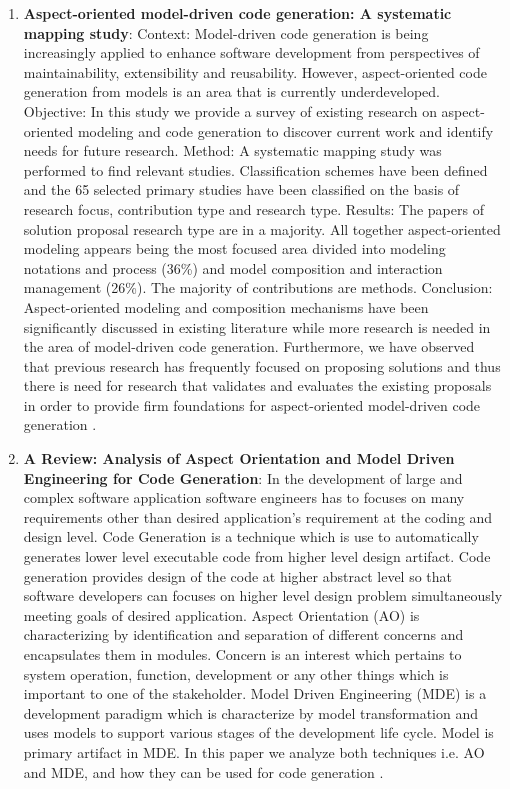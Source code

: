 \begin{englishtext}
\begin{enumerate}
    \item \textbf{Aspect-oriented model-driven code generation: A systematic
    mapping study}: Context: Model-driven code generation is being increasingly
    applied to enhance software development from perspectives of
    maintainability, extensibility and reusability. However, aspect-oriented
    code generation from models is an area that is currently underdeveloped.
    Objective: In this study we provide a survey of existing research on
    aspect-oriented modeling and code generation to discover current work and
    identify needs for future research. Method: A systematic mapping study was
    performed to find relevant studies. Classification schemes have been defined
    and the 65 selected primary studies have been classified on the basis of
    research focus, contribution type and research type. Results: The papers of
    solution proposal research type are in a majority. All together
    aspect-oriented modeling appears being the most focused area divided into
    modeling notations and process (36\%) and model composition and interaction
    management (26\%). The majority of contributions are methods. Conclusion:
    Aspect-oriented modeling and composition mechanisms have been significantly
    discussed in existing literature while more research is needed in the area
    of model-driven code generation. Furthermore, we have observed that previous
    research has frequently focused on proposing solutions and thus there is
    need for research that validates and evaluates the existing proposals in
    order to provide firm foundations for aspect-oriented model-driven code
    generation \cite{aspectOriented}.

    \item \textbf{A Review: Analysis of Aspect Orientation and Model Driven
    Engineering for Code Generation}: In the development of large and complex
    software application software engineers has to focuses on many requirements
    other than desired application’s requirement at the coding and design level.
    Code Generation is a technique which is use to automatically generates lower
    level executable code from higher level design artifact. Code generation
    provides design of the code at higher abstract level so that software
    developers can focuses on higher level design problem simultaneously meeting
    goals of desired application. Aspect Orientation (AO) is characterizing by
    identification and separation of different concerns and encapsulates them in
    modules. Concern is an interest which pertains to system operation,
    function, development or any other things which is important to one of the
    stakeholder. Model Driven Engineering (MDE) is a development paradigm which
    is characterize by model transformation and uses models to support various
    stages of the development life cycle. Model is primary artifact in MDE. In
    this paper we analyze both techniques i.e. AO and MDE, and how they can be
    used for code generation \cite{aspectOrientationReview}.


\end{enumerate}
\end{englishtext}
